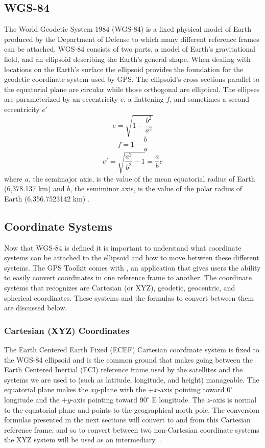 \subsection{WGS-84}
The World Geodetic System 1984 (WGS-84) is a fixed physical model of Earth produced by the Department of Defense to which many different reference frames can be attached. WGS-84 consists of two parts, a model of Earth's gravitational field, and an ellipsoid describing the Earth's general shape. When dealing with locations on the Earth's surface the ellipsoid provides the foundation for the geodetic coordinate system used by GPS. The ellipsoid's cross-sections parallel to the equatorial plane are circular while those orthogonal are elliptical. The ellipses are parameterized by an eccentricity $e$, a flattening $f$, and sometimes a second eccentricity $e'$
\[e=\sqrt{1-\frac{b^{2}}{a^{2}}}\]
\[f=1-\frac{b}{a}\]
\[e'=\sqrt{\frac{a^{2}}{b^{2}}-1}=\frac{a}{b}e\]
where $a$, the semimajor axis, is the value of the mean equatorial radius of Earth (6,378.137 km) and $b$, the semiminor axis, is the value of the polar radius of Earth (6,356.7523142 km) \cite[pp. 25-26]{kaplan:ugpspa}.
\subsection{Coordinate Systems}
Now that WGS-84 is defined it is important to understand what coordinate systems can be attached to the ellipsoid and how to move between these different systems. The GPS Toolkit comes with , an application that gives users the ability to easily convert coordinates in one reference frame to another. The coordinate 
systems that  recognizes are Cartesian (or XYZ), geodetic, geocentric, and spherical coordinates. These systems and the formulas to convert between them are discussed below.
\subsubsection{Cartesian (XYZ) Coordinates}
The Earth Centered Earth Fixed (ECEF) Cartesian coordinate system is fixed to the WGS-84 ellipsoid and is the common ground that makes going between the Earth Centered Inertial (ECI) reference frame used by the satellites and the systems we are used to (such as latitude, longitude, and height) manageable. The equatorial plane makes the $xy$-plane with the $+x$-axis pointing toward $0^{\circ}$ longitude and the $+y$-axis pointing toward $90^{\circ}$ E longitude. The $z$-axis is normal to the equatorial plane and points to the geographical north pole. The conversion formulas presented in the next sections will convert to and from this Cartesian reference frame, and so to convert between two non-Cartesian coordinate systems the XYZ system will be used as an intermediary~\cite[p. 24]{kaplan:ugpspa}.
